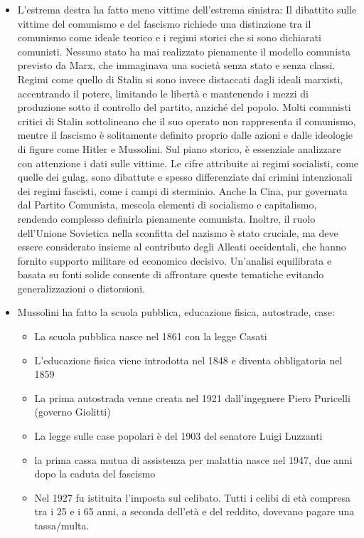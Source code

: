 \documentclass[12pt]{book} %
\begin{document}
\begin{mdframed}[linewidth=1pt]
\begin{itemize}
\item L'estrema destra ha fatto meno vittime dell'estrema sinistra: Il dibattito sulle vittime del comunismo e del fascismo richiede una distinzione tra il comunismo come ideale teorico e i regimi storici che si sono dichiarati comunisti. Nessuno stato ha mai realizzato pienamente il modello comunista previsto da Marx, che immaginava una società senza stato e senza classi. Regimi come quello di Stalin si sono invece distaccati dagli ideali marxisti, accentrando il potere, limitando le libertà e mantenendo i mezzi di produzione sotto il controllo del partito, anziché del popolo. Molti comunisti critici di Stalin sottolineano che il suo operato non rappresenta il comunismo, mentre il fascismo è solitamente definito proprio dalle azioni e dalle ideologie di figure come Hitler e Mussolini. Sul piano storico, è essenziale analizzare con attenzione i dati sulle vittime. Le cifre attribuite ai regimi socialisti, come quelle dei gulag, sono dibattute e spesso differenziate dai crimini intenzionali dei regimi fascisti, come i campi di sterminio. Anche la Cina, pur governata dal Partito Comunista, mescola elementi di socialismo e capitalismo, rendendo complesso definirla pienamente comunista. Inoltre, il ruolo dell’Unione Sovietica nella sconfitta del nazismo è stato cruciale, ma deve essere considerato insieme al contributo degli Alleati occidentali, che hanno fornito supporto militare ed economico decisivo. Un’analisi equilibrata e basata su fonti solide consente di affrontare queste tematiche evitando generalizzazioni o distorsioni.
\item Mussolini ha fatto la scuola pubblica, educazione fisica, autostrade, case:

\begin{itemize}
\item La scuola pubblica nasce nel 1861 con la legge Casati 
\item L'educazione fisica viene introdotta nel 1848 e diventa obbligatoria nel 1859 
\item La prima autostrada venne creata nel 1921 dall'ingegnere Piero Puricelli (governo Giolitti)
\item La legge sulle case popolari è del 1903 del senatore Luigi Luzzanti
\item la prima cassa mutua di assistenza per malattia nasce nel 1947, due anni dopo la caduta del fascismo
\item Nel 1927 fu istituita l'imposta sul celibato. Tutti i celibi di età compresa tra i 25 e i 65 anni, a seconda
dell'età e del reddito, dovevano pagare una tassa/multa.


\end{itemize}
\end{itemize}
\end{mdframed}
\end{document}
